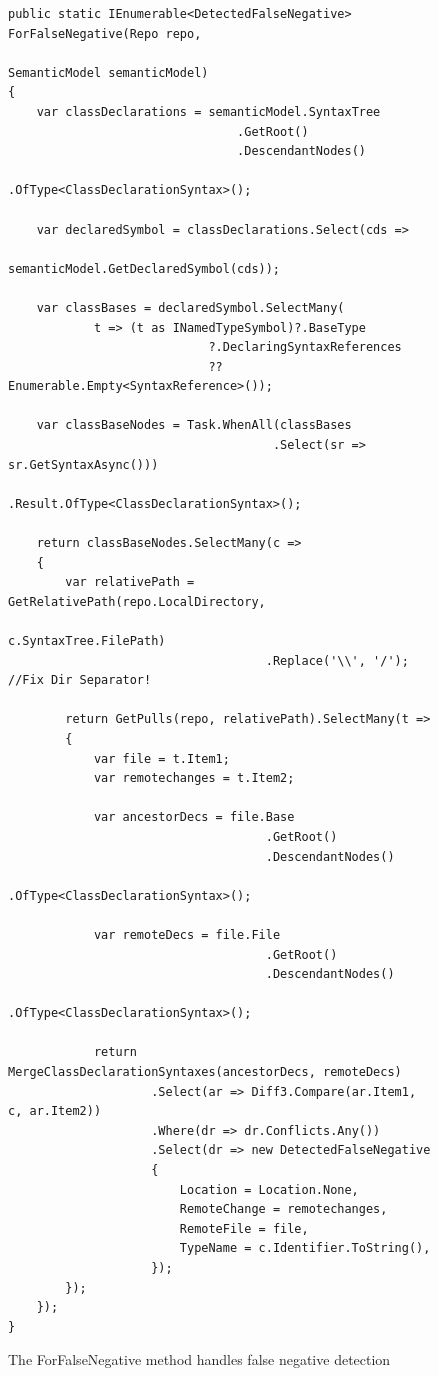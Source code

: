\documentclass[draftclsnofoot,onecolumn]{IEEEtran}
\begin{document}
\begin{figure}[!htb]
\centering
\begin{lstlisting}
public static IEnumerable<DetectedFalseNegative> ForFalseNegative(Repo repo,
                                                   SemanticModel semanticModel)
{
    var classDeclarations = semanticModel.SyntaxTree
                                .GetRoot()
                                .DescendantNodes()
                                .OfType<ClassDeclarationSyntax>();

    var declaredSymbol = classDeclarations.Select(cds => 
	                                     semanticModel.GetDeclaredSymbol(cds));

    var classBases = declaredSymbol.SelectMany(
            t => (t as INamedTypeSymbol)?.BaseType
                            ?.DeclaringSyntaxReferences 
							?? Enumerable.Empty<SyntaxReference>());

    var classBaseNodes = Task.WhenAll(classBases
	                                 .Select(sr => sr.GetSyntaxAsync()))
                           .Result.OfType<ClassDeclarationSyntax>();

    return classBaseNodes.SelectMany(c =>
    {
        var relativePath = GetRelativePath(repo.LocalDirectory, 
		                                                 c.SyntaxTree.FilePath)
                                    .Replace('\\', '/'); //Fix Dir Separator!

        return GetPulls(repo, relativePath).SelectMany(t =>
        {
            var file = t.Item1;
            var remotechanges = t.Item2;

            var ancestorDecs = file.Base
                                    .GetRoot()
                                    .DescendantNodes()
                                    .OfType<ClassDeclarationSyntax>();

            var remoteDecs = file.File
                                    .GetRoot()
                                    .DescendantNodes()
                                    .OfType<ClassDeclarationSyntax>();

            return MergeClassDeclarationSyntaxes(ancestorDecs, remoteDecs)
                    .Select(ar => Diff3.Compare(ar.Item1, c, ar.Item2))
                    .Where(dr => dr.Conflicts.Any())
                    .Select(dr => new DetectedFalseNegative
                    {
                        Location = Location.None,
                        RemoteChange = remotechanges,
                        RemoteFile = file,
                        TypeName = c.Identifier.ToString(),
                    });
        });
    });
}
\end{lstlisting}
\caption{The ForFalseNegative method handles false negative detection}
\label{anforfn}
\end{figure}
\end{document}
